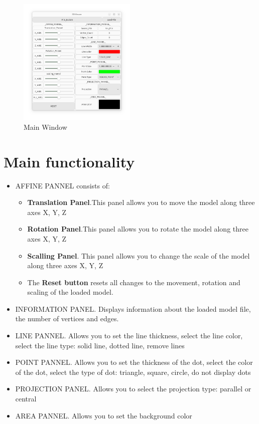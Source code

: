 \documentclass[12pt, legalpaper]{report}
\begin{document}
\begin{figure}[h]
	\centering
	\vspace*{\fill}
	\includegraphics[width=0.5\textwidth]{1}
	\vspace*{\fill}
	\caption{Main Window}
	\label{fig:main}
\end{figure}

\newpage

\chapter{Main functionality}

\begin{itemize}
	\item AFFINE PANNEL consists of:
	\begin{itemize}
		\item \textbf{Translation Panel}.This panel allows you to move the model along three axes X, Y, Z
		\item \textbf{Rotation Panel}.This panel allows you to rotate the model along three axes X, Y, Z
		\item \textbf{Scalling Panel}. This panel allows you to change the scale of the model along three axes X, Y, Z
		\item The \textbf{Reset button} resets all changes to the movement, rotation and scaling of the loaded model.
	\end{itemize}
	\item INFORMATION PANEL. Displays information about the loaded model file, the number of vertices and edges.
	\item LINE PANNEL. Allows you to set the line thickness, select the line color, select the line type: solid line, dotted line, remove lines
	\item POINT PANNEL. Allows you to set the thickness of the dot, select the color of the dot, select the type of dot: triangle, square, circle, do not display dots
	\item PROJECTION PANEL. Allows you to select the projection type: parallel or central
	\item AREA PANNEL. Allows you to set the background color
\end{itemize}
\end{document}
